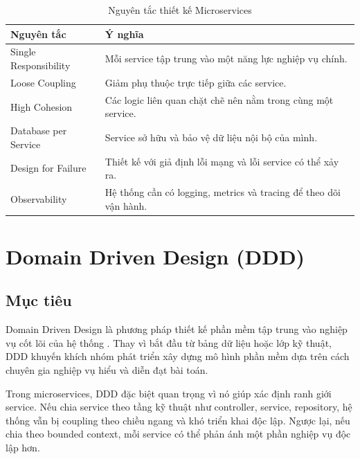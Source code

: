 \documentclass[../main.tex]{subfiles}
\begin{document}
\begin{table}[H]
    \centering
    \caption{Nguyên tắc thiết kế Microservices}
    \label{tab:chapter1_microservices_principles}
    \begin{tabular}{|p{}|p{}|}
        \hline
        \rowcolor{primary!35}
        \textbf{Nguyên tắc} & \textbf{Ý nghĩa} \\
        \hline
        Single Responsibility & Mỗi service tập trung vào một năng lực nghiệp vụ chính. \\
        \hline
        Loose Coupling & Giảm phụ thuộc trực tiếp giữa các service. \\
        \hline
        High Cohesion & Các logic liên quan chặt chẽ nên nằm trong cùng một service. \\
        \hline
        Database per Service & Service sở hữu và bảo vệ dữ liệu nội bộ của mình. \\
        \hline
        Design for Failure & Thiết kế với giả định lỗi mạng và lỗi service có thể xảy ra. \\
        \hline
        Observability & Hệ thống cần có logging, metrics và tracing để theo dõi vận hành. \\
        \hline
    \end{tabular}
\end{table}

\section{Domain Driven Design (DDD)}

\subsection{Mục tiêu}

Domain Driven Design là phương pháp thiết kế phần mềm tập trung vào nghiệp vụ cốt lõi của hệ thống \cite{evans2003domain}. Thay vì bắt đầu từ bảng dữ liệu hoặc lớp kỹ thuật, DDD khuyến khích nhóm phát triển xây dựng mô hình phần mềm dựa trên cách chuyên gia nghiệp vụ hiểu và diễn đạt bài toán.

Trong microservices, DDD đặc biệt quan trọng vì nó giúp xác định ranh giới service. Nếu chia service theo tầng kỹ thuật như controller, service, repository, hệ thống vẫn bị coupling theo chiều ngang và khó triển khai độc lập. Ngược lại, nếu chia theo bounded context, mỗi service có thể phản ánh một phần nghiệp vụ độc lập hơn.
\end{document}
